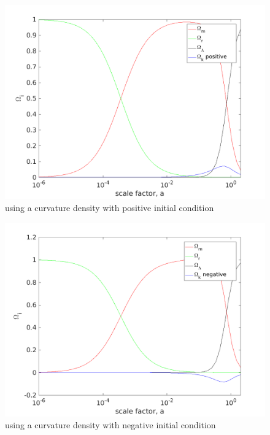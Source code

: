 \documentclass[12pt]{article}
\begin{document}
\begin{figure}
\centering
\includegraphics[width=6in]{Omega_k_pos.png}
\caption{using a curvature density with positive initial condition}
\end{figure}

\begin{figure}
\centering
\includegraphics[width=6in]{Omega_k_neg.png}
\caption{using a curvature density with negative initial condition}
\end{figure}
\end{document}
